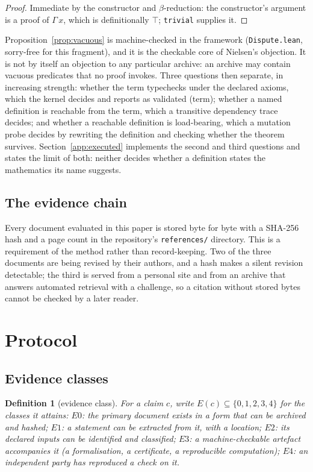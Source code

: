 \documentclass[11pt,a4paper]{article}
\newtheorem{definition}{Definition}
\newcommand{\verdict}[1]{\textsf{#1}}
\begin{document}
\begin{proof}
Immediate by the constructor and $\beta$-reduction: the constructor's argument is a proof of
$\Gamma\,x$, which is definitionally $\top$; \texttt{trivial} supplies it.
\end{proof}

Proposition~\ref{prop:vacuous} is machine-checked in the framework (\texttt{Dispute.lean},
sorry-free for this fragment), and it is the checkable core of Nielsen's objection. It is not by
itself an objection to any particular archive: an archive may contain vacuous predicates that no
proof invokes. Three questions then separate, in increasing strength: whether the term typechecks
under the declared axioms, which the kernel decides and reports as \verdict{validated (term)};
whether a named definition is reachable from the term, which a transitive dependency trace decides;
and whether a reachable definition is load-bearing, which a mutation probe decides by rewriting the
definition and checking whether the theorem survives. Section~\ref{app:executed} implements the
second and third questions and states the limit of both: neither decides whether a definition states
the mathematics its name suggests.


\subsection{The evidence chain}

Every document evaluated in this paper is stored byte for byte with a SHA-256 hash and a
page count in the repository's \texttt{references/} directory. This is a requirement of the method
rather than record-keeping. Two of the three documents are being revised by their authors, and a
hash makes a silent revision detectable; the third is served from a personal site and from an
archive that answers automated retrieval with a challenge, so a citation without stored bytes
cannot be checked by a later reader.

\section{Protocol}
\label{sec:protocol}

\subsection{Evidence classes}

\begin{definition}[evidence class]
For a claim $c$, write $E(c)\subseteq\{0,1,2,3,4\}$ for the classes it attains:
$E0$: the primary document exists in a form that can be archived and hashed;
$E1$: a statement can be extracted from it, with a location;
$E2$: its declared inputs can be identified and classified;
$E3$: a machine-checkable artefact accompanies it (a formalisation, a certificate, a
reproducible computation);
$E4$: an independent party has reproduced a check on it.
\end{definition}
\end{document}
